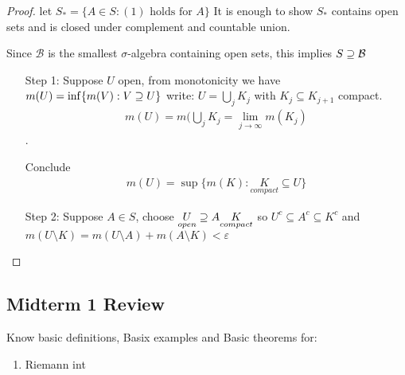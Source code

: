 \begin{proof}
	let $S_{*} = \{A \in S: (1) \text{ holds for $A$} \}$
It is enough to show $S_{*}$ contains open sets and is closed under complement and countable union.

Since $\mathcal{B}$ is the smallest $\sigma$-algebra containing open sets, this implies $S \supseteq \mathcal{B}$

\begin{enumerate}
	\item[Step 1:] Suppose $U$ open, from monotonicity we have $m(U) = \inf\{m(V) : V \supseteq U \}$
		write: $U = \bigcup_j K_j$ with  $K_j \subseteq K_{j+1}$ compact.
		\begin{align*}
			m(U) = m(\bigcup_j K_j = \lim_{j \to \infty} m(K_j)
		\end{align*} .

		Conclude
		\begin{align*}
			m(U) = \sup\{m(K) : \underset{compact}{K} \subseteq U \}
		\end{align*}

	\item[Step 2:] Suppose $A \in S$, choose $\underset{open}{U} \supseteq A \underset{compact}{K}$
		so $U^{c} \subseteq A^{c} \subseteq K^{c}$ and $m(U \setminus K) = m(U \setminus A) +m (A \setminus K) < \varepsilon$
\end{enumerate}

\end{proof}


\subsection*{Midterm 1 Review}
Know basic definitions, Basix examples and Basic theorems for:
\begin{enumerate}
	\item Riemann int
\end{enumerate}
